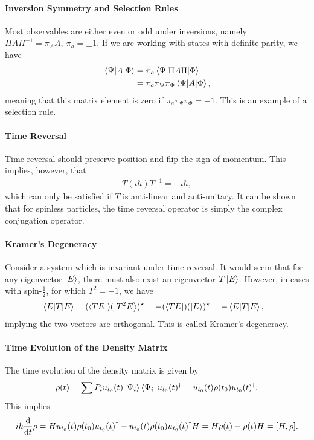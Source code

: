 \paragraph{Inversion Symmetry and Selection Rules}
Most observables are either even or odd under inversions, namely $\Pi A\Pi^{-1} = \pi_{A}A,\ \pi_{a} = \pm 1$. If we are working with states with definite parity, we have
\begin{align*}
	\mel{\Psi}{A}{\Phi} &= \pi_{a}\mel{\Psi}{\Pi A\Pi}{\Phi} \\
	                    &= \pi_{a}\pi_{\Psi}\pi_{\Phi}\mel{\Psi}{A}{\Phi},
\end{align*}
meaning that this matrix element is zero if $\pi_{a}\pi_{\Psi}\pi_{\Phi} = -1$. This is an example of a selection rule.

\paragraph{Time Reversal}
Time reversal should preserve position and flip the sign of momentum. This implies, however, that
\begin{align*}
	T(i\hbar)T^{-1} = -i\hbar,
\end{align*}
which can only be satisfied if $T$ is anti-linear and anti-unitary. It can be shown that for spinless particles, the time reversal operator is simply the complex conjugation operator.

\paragraph{Kramer's Degeneracy}
Consider a system which is invariant under time reversal. It would seem that for any eigenvector $\ket{E}$, there must also exist an eigenvector $T\ket{E}$. However, in cases with spin-$\frac{1}{2}$, for which $T^{2} = -1$, we have
\begin{align*}
	\mel{E}{T}{E} &= (\bra{TE})(\ket{T^{2}E})^{\star} = -(\bra{TE})(\ket{E})^{\star} = -\mel{E}{T}{E},
\end{align*}
implying the two vectors are orthogonal. This is called Kramer's degeneracy.

\paragraph{Time Evolution of the Density Matrix}
The time evolution of the density matrix is given by
\begin{align*}
	\rho(t) = \sum P_{i}u_{t_{0}}(t)\ket{\Psi_{i}}\bra{\Psi_{i}}u_{t_{0}}(t)^{\dagger} = u_{t_{0}}(t)\rho(t_{0})u_{t_{0}}(t)^{\dagger}.
\end{align*}
This implies
\begin{align*}
	i\hbar\dv{t}\rho = Hu_{t_{0}}(t)\rho(t_{0})\adj{u_{t_{0}}(t)} - u_{t_{0}}(t)\rho(t_{0})\adj{u_{t_{0}}(t)}H = H\rho(t) - \rho(t)H = \comm{H}{\rho}.
\end{align*}

